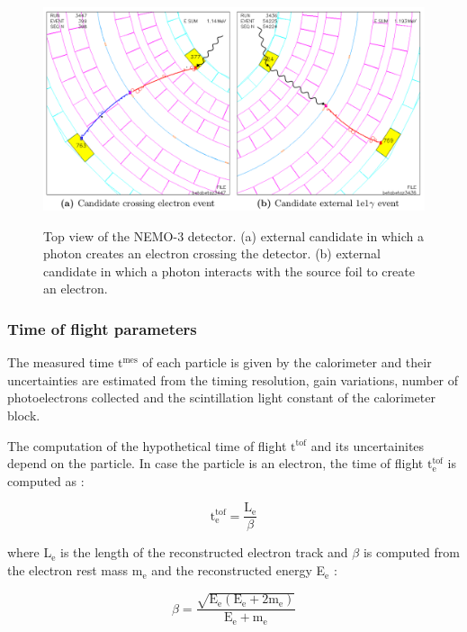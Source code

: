 \documentclass[main.tex]{subfiles}
\begin{document}
\begin{figure}[h!]
\centering
\includegraphics[scale=0.32]{pictures/Chap6/ExternalEvents.png}
\label{ExternalEventDisplay}
\caption{Top view of the NEMO-3 detector. (a) external candidate in which a photon creates an electron crossing the detector. (b) external candidate in which a photon interacts with the source foil to create an electron.}
\end{figure}


\subsubsection{Time of flight parameters}\label{sec:TOFinfo}


\NI The measured time $\text{t}^{\text{mes}}$ of each particle is given by the calorimeter and their uncertainties are estimated from the timing resolution, gain variations, number of photoelectrons collected and the scintillation light constant of the calorimeter block.


\bigskip


\NI The computation of the hypothetical time of flight $\text{t}^{\text{tof}}$ and its uncertainites depend on the particle. In case the particle is an electron, the time of flight $\text{t}_{\text{e}}^{\text{tof}}$ is computed as :


\begin{equation}\label{eq:TOFhyp}
\text{t}_\text{e}^{\text{tof}} = \frac{\text{L}_\text{e}}{\beta}
\end{equation}


\bigskip


\NI where L$_\text{e}$ is the length of the reconstructed electron track and $\beta$ is computed from the electron rest mass m$_\text{e}$ and the reconstructed energy E$_\text{e}$ : 


\begin{equation}
\beta = \frac{ \sqrt{\text{E}_\text{e} (\text{E}_\text{e} +\text{2m}_\text{e})} }{\text{E}_\text{e} + \text{m}_\text{e}}
\end{equation}
\end{document}
